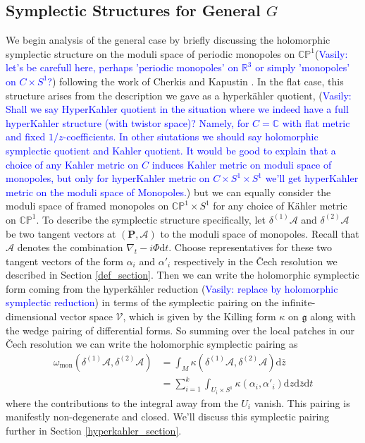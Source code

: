 \documentclass[11pt, oneside, reqno]{amsart}
\theoremstyle{definition} \newtheorem{definition}{Definition}[section]
\theoremstyle{definition} \newtheorem{remark}[definition]{Remark}
\theoremstyle{definition} \newtheorem{remarks}[definition]{Remarks}
\theoremstyle{definition} \newtheorem{question}[definition]{Question}
\theoremstyle{definition} \newtheorem*{note}{Note}
\theoremstyle{definition} \newtheorem{example}[definition]{Example}
\theoremstyle{definition} \newtheorem{examples}[definition]{Examples}
\renewcommand{\gg}{\mathfrak{g}}
\newcommand{\bb}[1]{\mathbb{#1}}
\newcommand{\mr}[1]{\mathrm{#1}}
\newcommand{\mc}[1]{\mathcal{#1}}
\newcommand{\bo}[1]{\boldsymbol{#1}}
\newcommand{\ol}[1]{\overline{#1}}
\renewcommand{\d}{\mathrm{d}}
\newcommand{\vasily}[1]{(\textcolor{blue}{Vasily: #1})}
\begin{document}
\subsection{Symplectic Structures for General $G$} \label{general_symplectic_sec}
We begin analysis of the general case by briefly discussing the holomorphic symplectic structure on the moduli space of periodic monopoles on $\bb{CP}^1$\vasily{let's be carefull here, perhaps 'periodic monopoles' on $\mathbb{R}^3$ or simply
  'monopoles' on $C \times S^1$?} 
  following the work of Cherkis and Kapustin \cite{CherkisKapustin1, CherkisKapustin3}.  In the flat case, this structure arises from the description we gave as a hyperk\"ahler quotient, \vasily{Shall we say HyperKahler quotient in the situation where we indeed have
  a full hyperKahler structure (with twistor space)? Namely, for $C = \mathbb{C}$ with flat metric
  and fixed $1/z$-coefficients. In other siutations we should say
  holomorphic symplectic quotient and Kahler quotient. It would be good
  to explain that a choice of any Kahler metric on $C$ induces Kahler
  metric on moduli space of monopoles, but only for hyperKahler metric
  on $C \times S^1 \times S^1$ we'll get hyperKahler metric on the moduli
  space of Monopoles.} but we can equally consider the moduli space of framed monopoles on $\bb{CP}^1 \times S^1$ for any choice of K\"ahler metric on $\bb{CP}^1$.  To describe the symplectic structure specifically, let $\delta^{(1)} \mc A$ and $\delta^{(2)} \mc A$ be two tangent vectors at $(\bo P, \mc A)$ to the moduli space of monopoles.  Recall that $\mc A$ denotes the combination $\nabla_t - i\Phi \d t$.  Choose representatives for these two tangent vectors of the form $\alpha_i$ and $\alpha'_i$ respectively in the \v Cech resolution we described in Section \ref{def_section}.  Then we can write the holomorphic symplectic form coming from the hyperk\"ahler reduction \vasily{replace by holomorphic symplectic reduction} in terms of the symplectic pairing on the infinite-dimensional vector space $\mc V$, which is given by the Killing form $\kappa$ on $\gg$ along with the wedge pairing of differential forms.  So summing over the local patches in our \v Cech resolution we can write the holomorphic symplectic pairing as
\begin{align*}
\omega_{\mr{mon}}(\delta^{(1)} \mc A, \delta^{(2)} \mc A) &= \int_{M} \kappa(\delta^{(1)} \mc A, \delta^{(2)} \mc A) \d \ol{z} \\
&= \sum_{i=1}^k \int_{U_i \times S^1} \kappa(\alpha_i, \alpha'_i) \d z \d \ol{z} \d t
\end{align*}
where the contributions to the integral away from the $U_i$ vanish.  This pairing is manifestly non-degenerate and closed.  We'll discuss this symplectic pairing further in Section \ref{hyperkahler_section}.
\end{document}
